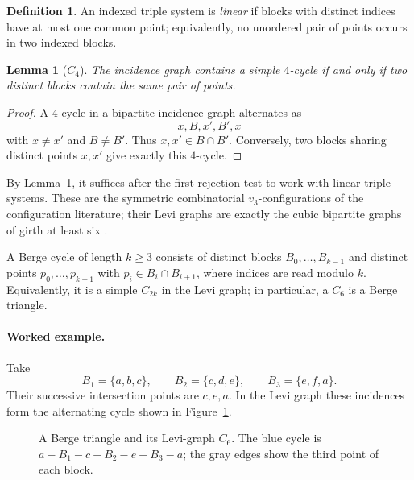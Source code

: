 \documentclass[11pt]{article}
\newtheorem{lemma}[theorem]{Lemma}
\theoremstyle{definition}
\newtheorem{definition}[theorem]{Definition}
\begin{document}
\begin{definition}
An indexed triple system is \emph{linear} if blocks with distinct indices
have at most one common point; equivalently, no unordered pair of points
occurs in two indexed blocks.
\end{definition}

\begin{lemma}[\(C_4\)]\label{lem:c4}
The incidence graph contains a simple \(4\)-cycle if and only if two distinct
blocks contain the same pair of points.
\end{lemma}

\begin{proof}
A \(4\)-cycle in a bipartite incidence graph alternates as
\[
  x,B,x',B',x
\]
with \(x\neq x'\) and \(B\neq B'\).  Thus \(x,x'\in B\cap B'\).  Conversely,
two blocks sharing distinct points \(x,x'\) give exactly this \(4\)-cycle.
\end{proof}

By Lemma~\ref{lem:c4}, it suffices after the first rejection test to work with
linear triple systems.  These are the symmetric combinatorial
\(v_3\)-configurations of the configuration literature; their Levi graphs are
exactly the cubic bipartite graphs of girth at least six
\cite{BettenBrinkmannPisanski2000,Boben2007}.

A Berge cycle of length \(k\geq3\) consists of distinct blocks
\(B_0,\ldots,B_{k-1}\) and distinct points \(p_0,\ldots,p_{k-1}\) with
\(p_i\in B_i\cap B_{i+1}\), where indices are read modulo \(k\).
Equivalently, it is a simple \(C_{2k}\) in the Levi graph; in particular, a
\(C_6\) is a Berge triangle.

\paragraph{Worked example.}
Take
\[
  B_1=\{a,b,c\},\qquad B_2=\{c,d,e\},\qquad
  B_3=\{e,f,a\}.
\]
Their successive intersection points are \(c,e,a\). In the Levi graph these
incidences form the alternating cycle shown in
Figure~\ref{fig:incidence-triangle}.

\begin{figure}[htbp]
\centering
{}
\caption{A Berge triangle and its Levi-graph \(C_6\). The blue cycle is
\(a-B_1-c-B_2-e-B_3-a\); the gray edges show the third point of each block.}
\label{fig:incidence-triangle}
\end{figure}
\end{document}
